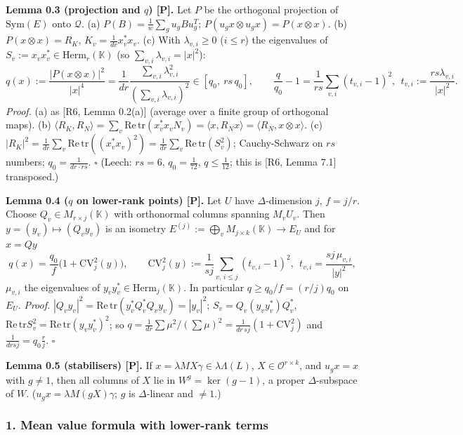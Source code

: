 \textbf{Lemma 0.3 (projection and \(q\)) {[}P{]}.} Let \(P\) be the orthogonal projection of \(\mathrm{Sym}(E)\) onto \(\mathcal Q\). (a) \(P(B)=\frac1w\sum_gu_gBu_g^T\); \(P(u_gx\otimes u_gx)=P(x\otimes x)\). (b) \(P(x\otimes x)=R_K\), \(K_v=\frac1{dr}x_v^*x_v\). (c) With \(\lambda_{v,i}\ge0\) (\(i\le r\)) the eigenvalues of \(S_v:=x_vx_v^*\in\mathrm{Herm}_r(\mathbb K)\) (so \(\sum_{v,i}\lambda_{v,i}=|x|^2\)):
\[q(x):=\frac{|P(x\otimes x)|^2}{|x|^4}=\frac1{dr}\frac{\sum_{v,i}\lambda_{v,i}^2}{(\sum_{v,i}\lambda_{v,i})^2}\in[q_0,\ rs\,q_0],\qquad \frac q{q_0}-1=\frac1{rs}\sum_{v,i}(t_{v,i}-1)^2,\ \ t_{v,i}:=\frac{rs\lambda_{v,i}}{|x|^2}.\]
\emph{Proof.} (a) as {[}R6, Lemma 0.2(a){]} (average over a finite group of orthogonal maps). (b) \(\langle R_K,R_N\rangle=\sum_v\mathrm{Re\,tr}(x_v^*x_vN_v)=\langle x,R_Nx\rangle=\langle R_N,x\otimes x\rangle\). (c) \(|R_K|^2=\frac1{dr}\sum_v\mathrm{Re\,tr}((x_v^*x_v)^2)=\frac1{dr}\sum_v\mathrm{Re\,tr}(S_v^2)\); Cauchy-Schwarz on \(rs\) numbers; \(q_0=\frac1{dr\cdot rs}\). \(\square\) (Leech: \(rs=6\), \(q_0=\frac1{72}\), \(q\le\frac1{12}\); this is {[}R6, Lemma 7.1{]} transposed.)

\textbf{Lemma 0.4 (\(q\) on lower-rank points) {[}P{]}.} Let \(U\) have \(\Delta\)-dimension \(j\), \(f=j/r\). Choose \(Q_v\in M_{r\times j}(\mathbb K)\) with orthonormal columns spanning \(M_vU_v\). Then \(y=(y_v)\mapsto(Q_vy_v)\) is an isometry \(E^{(j)}:=\bigoplus_vM_{j\times k}(\mathbb K)\to E_U\) and for \(x=Qy\)
\[q(x)=\frac{q_0}{f}\big(1+\mathrm{CV}_j^2(y)\big),\qquad \mathrm{CV}_j^2(y):=\frac1{sj}\sum_{v,\,i\le j}(t_{v,i}-1)^2,\ \ t_{v,i}=\frac{sj\,\mu_{v,i}}{|y|^2},\]
\(\mu_{v,i}\) the eigenvalues of \(y_vy_v^*\in\mathrm{Herm}_j(\mathbb K)\). In particular \(q\ge q_0/f=(r/j)q_0\) on \(E_U\).
\emph{Proof.} \(|Q_vy_v|^2=\mathrm{Re\,tr}(y_v^*Q_v^*Q_vy_v)=|y_v|^2\); \(S_v=Q_v(y_vy_v^*)Q_v^*\), \(\mathrm{Re\,tr}S_v^2=\mathrm{Re\,tr}(y_vy_v^*)^2\); so \(q=\frac1{dr}\sum\mu^2/(\sum\mu)^2=\frac1{dr\,sj}(1+\mathrm{CV}_j^2)\) and \(\frac1{drsj}=q_0\frac rj\). \(\square\)

\textbf{Lemma 0.5 (stabilisers) {[}P{]}.} If \(x=\lambda MX\gamma\in\lambda\Lambda(L)\), \(X\in\mathcal O^{r\times k}\), and \(u_gx=x\) with \(g\ne1\), then all columns of \(X\) lie in \(W^g=\ker(g-1)\), a proper \(\Delta\)-subspace of \(W\). (\(u_gx=\lambda M(gX)\gamma\); \(g\) is \(\Delta\)-linear and \(\ne1\).)

\hypertarget{mean-value-formula-with-lower-rank-terms}{%
\subsubsection*{1. Mean value formula with lower-rank terms}\label{mean-value-formula-with-lower-rank-terms}}

